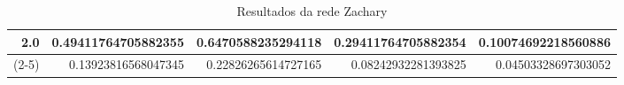 \begin{table}[]
	\begin{center}
      	\begin{tabular}{|r|r|r|r|r|}
      	\hline

		2.0	&0.49411764705882355&0.6470588235294118&0.29411764705882354&0.10074692218560886\\ \cline(2-5) 
			&0.13923816568047345&0.22826265614727165&0.08242932281393825&0.04503328697303052\\ \hline 


		\end{tabular}
    \end{center}
	\caption{Resultados da rede Zachary}
	\label{tab:zac_infos}
\end{table}
